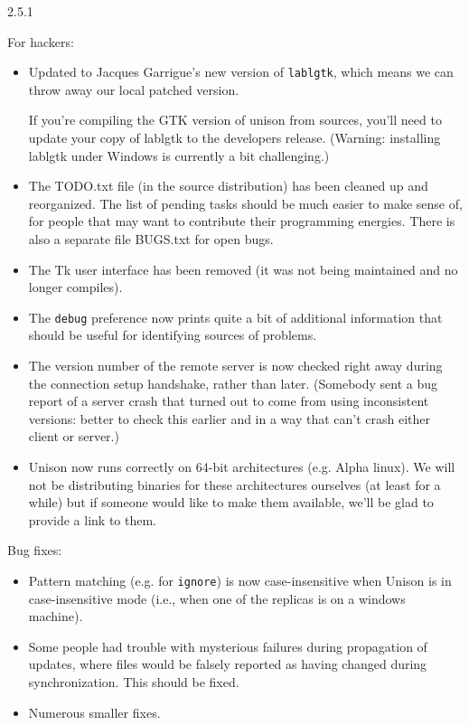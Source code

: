 \begin{changesfromversion}{2.5.1}
\item For hackers:
\begin{itemize}
\item Updated to Jacques Garrigue's new version of \verb|lablgtk|, which
  means we can throw away our local patched version.

  If you're compiling the GTK version of unison from sources, you'll need
  to update your copy of lablgtk to the developers release.
  (Warning: installing lablgtk under Windows is currently a bit
  challenging.)

\item The TODO.txt file (in the source distribution) has been cleaned up
and reorganized.  The list of pending tasks should be much easier to
make sense of, for people that may want to contribute their programming
energies.  There is also a separate file BUGS.txt for open bugs.
\item The Tk user interface has been removed (it was not being maintained
and no longer compiles).
\item The \verb|debug| preference now prints quite a bit of additional
information that should be useful for identifying sources of problems.
\item The version number of the remote server is now checked right away
  during the connection setup handshake, rather than later.  (Somebody
  sent a bug report of a server crash that turned out to come from using
  inconsistent versions: better to check this earlier and in a way that
  can't crash either client or server.)
\item Unison now runs correctly on 64-bit architectures (e.g. Alpha
linux).  We will not be distributing binaries for these architectures
ourselves (at least for a while) but if someone would like to make them
available, we'll be glad to provide a link to them.
\end{itemize}

\item Bug fixes:
\begin{itemize}
\item Pattern matching (e.g. for \verb|ignore|) is now case-insensitive
  when Unison is in case-insensitive mode (i.e., when one of the replicas
  is on a windows machine).
\item Some people had trouble with mysterious failures during
  propagation of updates, where files would be falsely reported as having
  changed during synchronization.  This should be fixed.
\item Numerous smaller fixes.
\end{itemize}
\end{changesfromversion}

